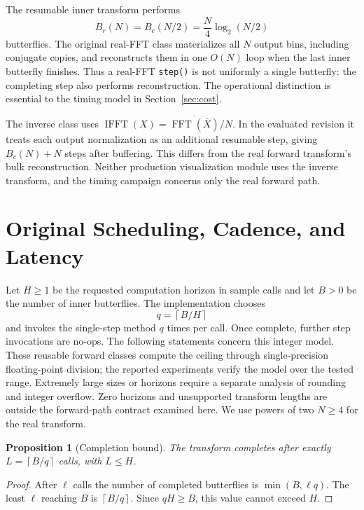 \documentclass[11pt,letterpaper]{article}
\newtheorem{proposition}{Proposition}
\newcommand{\code}[1]{\texttt{#1}}
\newcommand{\ceil}[1]{\left\lceil #1\right\rceil}
\begin{document}
The resumable inner transform performs
\begin{equation}
 B_r(N)=B_c(N/2)=\frac{N}{4}\log_2(N/2)
 \label{eq:countreal}
\end{equation}
butterflies. The original real-FFT class materializes all $N$ output bins, including conjugate
copies, and reconstructs them in one $O(N)$ loop when the last inner butterfly
finishes. Thus a real-FFT \code{step()} is not uniformly a single butterfly:
the completing step also performs reconstruction. The operational distinction
is essential to the timing model in Section~\ref{sec:cost}.

The inverse class uses
$\operatorname{IFFT}(X)=\overline{\operatorname{FFT}(\overline X)}/N$.
In the evaluated revision it treats each output normalization as an additional
resumable step, giving $B_c(N)+N$ steps after buffering. This differs from the
real forward transform's bulk reconstruction. Neither production visualization
module uses the inverse transform, and the timing campaign concerns only the
real forward path.

\section{Original Scheduling, Cadence, and Latency}
\label{sec:scheduling}
Let $H\ge1$ be the requested computation horizon in sample calls and let $B>0$
be the number of inner butterflies. The implementation chooses
\begin{equation}
 q=\ceil{B/H}
 \label{eq:quota}
\end{equation}
and invokes the single-step method $q$ times per call. Once complete, further
step invocations are no-ops. The following statements concern this integer
model. These reusable forward classes compute the ceiling through single-precision
floating-point division; the reported experiments verify the model over the
tested range. Extremely large sizes or horizons require a separate analysis of
rounding and integer overflow. Zero horizons and unsupported transform lengths
are outside the forward-path contract examined here. We use powers of two
$N\ge4$ for the real transform.

\begin{proposition}[Completion bound]
The transform completes after exactly $L=\ceil{B/q}$ calls, with $L\le H$.
\end{proposition}
\begin{proof}
After $\ell$ calls the number of completed butterflies is
$\min(B,\ell q)$. The least $\ell$ reaching $B$ is $\ceil{B/q}$.
Since $qH\ge B$, this value cannot exceed $H$.
\end{proof}
\end{document}

